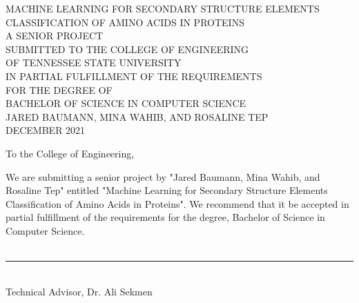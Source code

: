 \documentclass[12pt,letterpaper,oneside,reqno]{book}
\theoremstyle{plain}
\theoremstyle{definition}
\theoremstyle{plain}
\theoremstyle{remark}
\theoremstyle{plain}
\theoremstyle{definition}
\theoremstyle{plain}
\newcommand*{\threeemdash}{\rule[0.5ex]{17em}{1.5pt}}
\newcommand*{\xdash}[1][3em]{\rule[0.5ex]{#1}{0.55pt}}
\begin{document}

\frontmatter


\thispagestyle{empty}
\doublespacing
\begin{center}

\large \MakeUppercase{Machine Learning for Secondary Structure Elements Classification of Amino Acids in Proteins}\\
\vspace{4cm}
A SENIOR PROJECT\\
SUBMITTED TO THE COLLEGE OF ENGINEERING\\
OF TENNESSEE STATE UNIVERSITY\\
IN PARTIAL FULFILLMENT OF THE REQUIREMENTS\\
FOR THE DEGREE OF \\
BACHELOR OF SCIENCE IN COMPUTER SCIENCE\\
\vspace{6cm}
JARED BAUMANN, MINA WAHIB, AND ROSALINE TEP\\
DECEMBER 2021\\ 
\end{center}

\hspace{1cm} 


\newpage
\noindent To the College of Engineering,

\indent We are submitting a senior project by "Jared Baumann, Mina Wahib, and Rosaline Tep" entitled "Machine Learning for Secondary Structure Elements Classification of Amino Acids in Proteins". We recommend that it be accepted in partial fulfillment of the requirements for the degree, Bachelor of Science in Computer Science.\\ \\

\hspace{8cm} \threeemdash \vspace{-0.4cm} \\
\indent \hspace{8cm} Technical Advisor, Dr. Ali Sekmen\\ 
\vspace{0.3cm}
\end{document}
